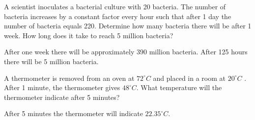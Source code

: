 \begin{Exercise}[difficulty=1] A scientist inoculates a bacterial culture with 20 bacteria. The number of bacteria increases by a constant factor every hour such that after 1 day the number of bacteria equals 220. 
\Question Determine how many bacteria there will be after 1 week.  %
\Question How long does it take to reach 5 million bacteria? %

\end{Exercise}

\begin{Answer}\phantom{}
    
    \Question After one week there will be approximately $390$ million bacteria. %
    \Question After 125 hours there will be 5 million bacteria.
    \EndCurrentQuestion	
\end{Answer}

\begin{Exercise}[difficulty=1] A thermometer is removed from an oven at  $72^{\circ} C$ and placed in a room at $20^{\circ} C$ . After 1 minute, the thermometer gives $48^{\circ} C$. What temperature will the thermometer indicate after 5 minutes? 

\end{Exercise}

\begin{Answer}\phantom{}
    After 5 minutes the thermometer will indicate $22.35^{\circ} C$.
\end{Answer}

